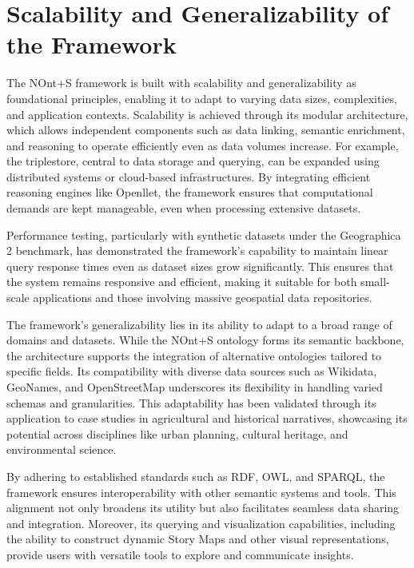 

\section{Scalability and Generalizability of the Framework}\label{VI-sec:scalability}

The NOnt+S framework is built with scalability and generalizability as foundational principles, enabling it to adapt to varying data sizes, complexities, and application contexts. Scalability is achieved through its modular architecture, which allows independent components such as data linking, semantic enrichment, and reasoning to operate efficiently even as data volumes increase. For example, the triplestore, central to data storage and querying, can be expanded using distributed systems or cloud-based infrastructures. By integrating efficient reasoning engines like Openllet, the framework ensures that computational demands are kept manageable, even when processing extensive datasets.

Performance testing, particularly with synthetic datasets under the Geographica 2 benchmark, has demonstrated the framework’s capability to maintain linear query response times even as dataset sizes grow significantly. This ensures that the system remains responsive and efficient, making it suitable for both small-scale applications and those involving massive geospatial data repositories.

The framework’s generalizability lies in its ability to adapt to a broad range of domains and datasets. While the NOnt+S ontology forms its semantic backbone, the architecture supports the integration of alternative ontologies tailored to specific fields. Its compatibility with diverse data sources such as Wikidata, GeoNames, and OpenStreetMap underscores its flexibility in handling varied schemas and granularities. This adaptability has been validated through its application to case studies in agricultural and historical narratives, showcasing its potential across disciplines like urban planning, cultural heritage, and environmental science.

By adhering to established standards such as RDF, OWL, and SPARQL, the framework ensures interoperability with other semantic systems and tools. This alignment not only broadens its utility but also facilitates seamless data sharing and integration. Moreover, its querying and visualization capabilities, including the ability to construct dynamic Story Maps and other visual representations, provide users with versatile tools to explore and communicate insights.

